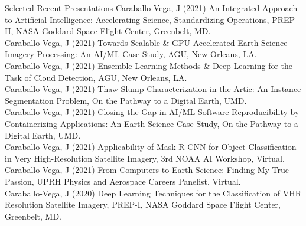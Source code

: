 \documentclass{resume} %
\begin{document}

\begin{rSection}{Selected Recent Presentations}
Caraballo-Vega, J (2021) An Integrated Approach to Artificial Intelligence: Accelerating Science, Standardizing Operations, PREP-II, NASA Goddard Space Flight Center, Greenbelt, MD. \\
Caraballo-Vega, J (2021) Towards Scalable \& GPU Accelerated Earth Science Imagery Processing: An AI/ML Case Study,  AGU, New Orleans, LA.\\
Caraballo-Vega, J (2021) Ensemble Learning Methods \& Deep Learning for the Task of Cloud Detection, AGU, New Orleans, LA.\\
Caraballo-Vega, J (2021) Thaw Slump Characterization in the Artic: An Instance Segmentation Problem, On the Pathway to a Digital Earth, UMD.\\
Caraballo-Vega, J (2021) Closing the Gap in AI/ML Software Reproducibility by Containerizing Applications: An Earth Science Case Study, On the Pathway to a Digital Earth, UMD.\\
Caraballo-Vega, J (2021) Applicability of Mask R-CNN for Object Classification in Very High-Resolution Satellite Imagery,  3rd NOAA AI Workshop, Virtual. \\
Caraballo-Vega, J (2021) From Computers to Earth Science: Finding My True Passion,  UPRH Physics and Aerospace Careers Panelist, Virtual. \\
Caraballo-Vega, J (2020) Deep Learning Techniques for the Classification of VHR Resolution Satellite Imagery, PREP-I, NASA Goddard Space Flight Center, Greenbelt, MD. \\
\end{rSection}

\end{document}
